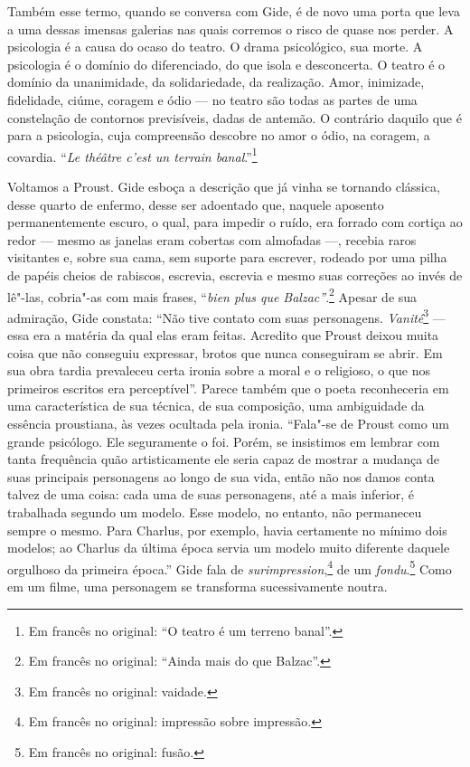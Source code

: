 Também esse termo, quando se conversa com Gide, é de novo uma porta que
leva a uma dessas imensas galerias nas quais corremos o risco de quase nos
perder. A psicologia é a causa do ocaso do teatro. O drama psicológico,
sua morte. A psicologia é o domínio do diferenciado, do que isola e
desconcerta. O teatro é o domínio da unanimidade, da solidariedade, da
realização. Amor, inimizade, fidelidade, ciúme, coragem e ódio --- no
teatro são todas as partes de uma constelação de contornos previsíveis,
dadas de antemão. O contrário daquilo que é para a psicologia, cuja
compreensão descobre no amor o ódio, na coragem, a covardia. ``\emph{Le
théâtre c'est un terrain banal}.''\footnote{Em francês no original: ``O teatro é um terreno banal''. \versal{[N.~T.]}}

Voltamos a Proust. Gide esboça a descrição que já vinha se tornando
clássica, desse quarto de enfermo, desse ser adoentado que, naquele aposento
permanentemente escuro, o qual, para impedir o ruído, era forrado
com cortiça ao redor --- mesmo as janelas eram cobertas com almofadas ---,
recebia raros visitantes e, sobre sua cama, sem suporte para escrever,
rodeado por uma pilha de papéis cheios de rabiscos, escrevia, escrevia e
mesmo suas correções ao invés de lê"-las, cobria"-as com mais frases,
``\emph{bien plus que Balzac''}.\footnote{Em francês no original: ``Ainda mais do que
  Balzac''. \versal{[N.~T.]}} Apesar de sua admiração, Gide constata: ``Não tive
contato com suas personagens. \emph{Vanité}\footnote{Em francês no original: vaidade. \versal{[N.~T.]}} --- essa era a matéria da qual elas eram feitas. Acredito que
Proust deixou muita coisa que não conseguiu expressar, brotos que nunca
conseguiram se abrir. Em sua obra tardia prevaleceu certa ironia sobre a
moral e o religioso, o que nos primeiros escritos era perceptível''.
Parece também que o poeta reconheceria em uma característica de sua
técnica, de sua composição, uma ambiguidade da essência proustiana, às
vezes ocultada pela ironia. ``Fala"-se de Proust como um grande
psicólogo. Ele seguramente o foi. Porém, se insistimos em lembrar com
tanta frequência quão artisticamente ele seria capaz de mostrar a
mudança de suas principais personagens ao longo de sua vida, então não
nos damos conta talvez de uma coisa: cada uma de suas personagens, até a
mais inferior, é trabalhada segundo um modelo. Esse modelo, no entanto,
não permaneceu sempre o mesmo. Para Charlus, por exemplo, havia
certamente no mínimo dois modelos; ao Charlus da última época servia um
modelo muito diferente daquele orgulhoso da primeira época.'' Gide fala
de \emph{surimpression},\footnote{Em francês no original: impressão sobre impressão. \versal{[N.~T.]}} de um \emph{fondu}.\footnote{Em francês no original: fusão. \versal{[N.~T.]}} Como em um filme, uma personagem se transforma sucessivamente
noutra.

